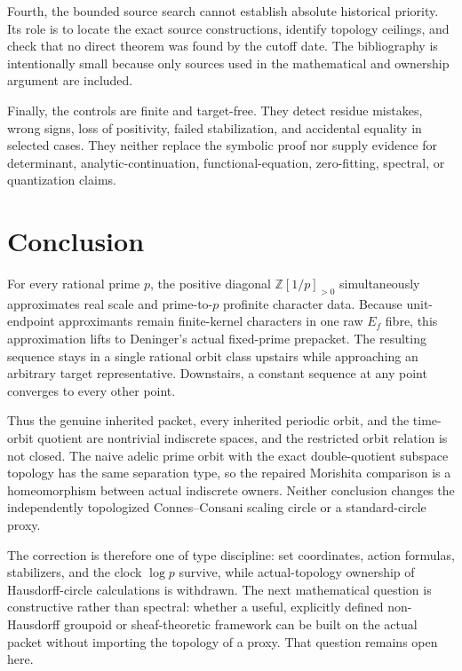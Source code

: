 \documentclass[11pt]{article}
\theoremstyle{definition}
\newcommand{\Z}{\mathbb{Z}}
\begin{document}
Fourth, the bounded source search cannot establish absolute historical priority.  Its role is to locate the exact source constructions, identify topology ceilings, and check that no direct theorem was found by the cutoff date.  The bibliography is intentionally small because only sources used in the mathematical and ownership argument are included.

Finally, the controls are finite and target-free.  They detect residue mistakes, wrong signs, loss of positivity, failed stabilization, and accidental equality in selected cases.  They neither replace the symbolic proof nor supply evidence for determinant, analytic-continuation, functional-equation, zero-fitting, spectral, or quantization claims.

\section{Conclusion}

For every rational prime \(p\), the positive diagonal \(\Z[1/p]_{>0}\) simultaneously approximates real scale and prime-to-\(p\) profinite character data.  Because unit-endpoint approximants remain finite-kernel characters in one raw \(E_f\) fibre, this approximation lifts to Deninger's actual fixed-prime prepacket.  The resulting sequence stays in a single rational orbit class upstairs while approaching an arbitrary target representative.  Downstairs, a constant sequence at any point converges to every other point.

Thus the genuine inherited packet, every inherited periodic orbit, and the time-orbit quotient are nontrivial indiscrete spaces, and the restricted orbit relation is not closed.  The naive adelic prime orbit with the exact double-quotient subspace topology has the same separation type, so the repaired Morishita comparison is a homeomorphism between actual indiscrete owners.  Neither conclusion changes the independently topologized Connes--Consani scaling circle or a standard-circle proxy.

The correction is therefore one of type discipline: set coordinates, action formulas, stabilizers, and the clock \(\log p\) survive, while actual-topology ownership of Hausdorff-circle calculations is withdrawn.  The next mathematical question is constructive rather than spectral: whether a useful, explicitly defined non-Hausdorff groupoid or sheaf-theoretic framework can be built on the actual packet without importing the topology of a proxy.  That question remains open here.
\end{document}
